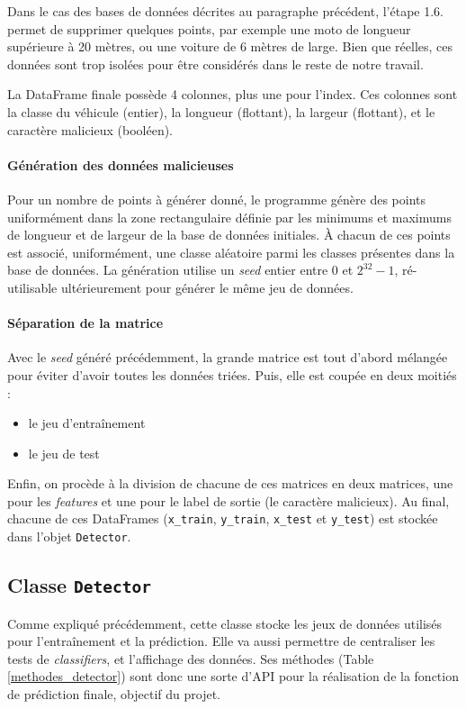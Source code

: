 \documentclass[a4paper]{report}
\begin{document}
Dans le cas des bases de données décrites au paragraphe précédent, l'étape 1.6. permet de supprimer quelques points, par exemple une moto de longueur supérieure à 20 mètres, ou une voiture de 6 mètres de large. Bien que réelles, ces données sont trop isolées pour être considérés dans le reste de notre travail.

La DataFrame finale possède 4 colonnes, plus une pour l'index. Ces colonnes sont la classe du véhicule (entier), la longueur (flottant), la largeur (flottant), et le caractère malicieux (booléen).

\paragraph{Génération des données malicieuses} Pour un nombre de points à générer donné, le programme génère des points uniformément dans la zone rectangulaire définie par les minimums et maximums de longueur et de largeur de la base de données initiales. À chacun de ces points est associé, uniformément, une classe aléatoire parmi les classes présentes dans la base de données. La génération utilise un \emph{seed} entier entre 0 et $2^{32}-1$, ré-utilisable ultérieurement pour générer le même jeu de données.

\paragraph{Séparation de la matrice} Avec le \emph{seed} généré précédemment, la grande matrice est tout d'abord mélangée pour éviter d'avoir toutes les données triées. Puis, elle est coupée en deux moitiés :
\begin{itemize}
\item le jeu d'entraînement
\item le jeu de test
\end{itemize}
Enfin, on procède à la division de chacune de ces matrices en deux matrices, une pour les \emph{features} et une pour le label de sortie (le caractère malicieux). Au final, chacune de ces DataFrames (\texttt{x\_train}, \texttt{y\_train}, \texttt{x\_test} et \texttt{y\_test}) est stockée dans l'objet \texttt{Detector}.

\subsection{Classe \texttt{Detector}}

Comme expliqué précédemment, cette classe stocke les jeux de données utilisés pour l'entraînement et la prédiction. Elle va aussi permettre de centraliser les tests de \emph{classifiers}, et l'affichage des données. Ses méthodes (Table \ref{methodes_detector}) sont donc une sorte d'API pour la réalisation de la fonction de prédiction finale, objectif du projet.
\end{document}
